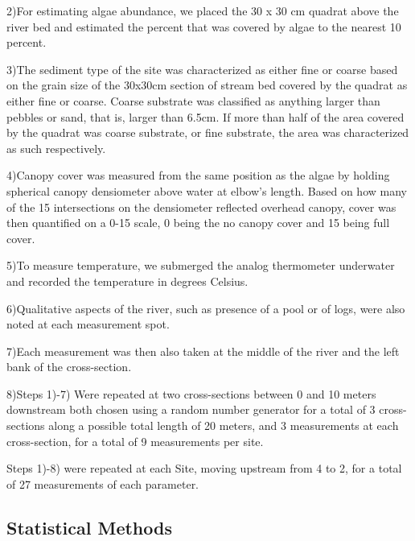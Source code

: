 \documentclass{article}\usepackage[]{graphicx}\usepackage[]{color}
\begin{document}
2)For estimating algae abundance, we placed the 30  x 30 cm quadrat above the river bed and estimated
the percent that was covered by algae to the nearest 10 percent.

3)The sediment type of the site was characterized as either fine or coarse based on the grain size of the 30x30cm section of stream bed covered by the quadrat as either fine or coarse. Coarse substrate was classified as anything larger than pebbles or sand, that is, larger than 6.5cm. If more than half of the area covered by the quadrat was coarse substrate, or fine substrate, the area was characterized as such respectively.

4)Canopy cover was measured from the same position as the algae by holding spherical canopy densiometer above water at elbow’s length. Based on how many of the 15 intersections on the densiometer reflected overhead canopy, cover was then quantified on a 0-15 scale, 0 being the no canopy cover and 15 being full cover.

5)To measure temperature, we submerged the analog thermometer underwater and recorded the temperature in degrees Celsius.

6)Qualitative aspects of the river, such as presence of a pool or of logs, were also noted at each measurement spot.

7)Each measurement was then also taken at the middle of the river and the left bank of the cross-section. 

8)Steps 1)-7) Were repeated at two cross-sections between 0 and 10 meters downstream both chosen using a random number generator for a total of 3 cross-sections along a possible total length of 20 meters, and 3 measurements at each cross-section, for a total of 9 measurements per site. 


Steps 1)-8) were repeated at each Site, moving upstream from 4 to 2, for a total of 27 measurements of each parameter.


\subsection{Statistical Methods}
\end{document}
